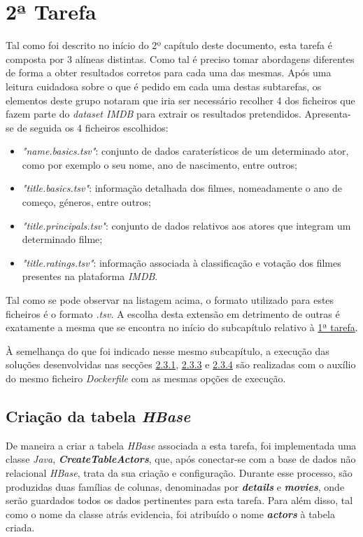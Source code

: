 \documentclass[a4paper]{report}
\begin{document}
{	\section{2ª Tarefa} \label{sec:Task2}
	Tal como foi descrito no início do 2º capítulo deste documento, esta tarefa é composta por 3 alíneas distintas. Como tal é preciso tomar abordagens diferentes de forma a obter resultados corretos para cada uma das mesmas. 
	Após uma leitura cuidadosa sobre o que é pedido em cada uma destas subtarefas, os elementos deste grupo notaram que iria ser necessário recolher 4 dos ficheiros que fazem parte do \textit{dataset IMDB} para extrair os resultados pretendidos.
	Apresenta-se de seguida os 4 ficheiros escolhidos:
	\begin{itemize}
		\item \textit{"name.basics.tsv"}: conjunto de dados caraterísticos de um determinado ator, como por exemplo o seu nome, ano de nascimento, entre outros;
		\item \textit{"title.basics.tsv"}: informação detalhada dos filmes, nomeadamente o ano de começo, géneros, entre outros;
		\item \textit{"title.principals.tsv"}: conjunto de dados relativos aos atores que integram um determinado filme;
		\item \textit{"title.ratings.tsv"}: informação associada à classificação e votação dos filmes presentes na plataforma \textit{IMDB}.
	\end{itemize}
	
	Tal como se pode observar na listagem acima, o formato utilizado para estes ficheiros é o formato \textit{.tsv}. A escolha desta extensão em detrimento de outras é exatamente a mesma que se encontra no início do subcapítulo relativo à \hyperref[sec:Task1]{1ª tarefa}.
	
	À semelhança do que foi indicado nesse mesmo subcapítulo, a execução das soluções desenvolvidas nas secções \hyperref[subsec:Task2-1]{2.3.1}, \hyperref[subsec:Task2-3]{2.3.3} e \hyperref[subsec:Task2-4]{2.3.4} são realizadas com o auxílio do mesmo ficheiro \textit{Dockerfile} com as mesmas opções de execução.
		
		\subsection{Criação da tabela \textit{HBase}} \label{subsec:Task2-1}
		De maneira a criar a tabela \textit{HBase} associada a esta tarefa, foi implementada uma classe \textit{Java}, \textbf{\textit{CreateTableActors}}, que, após conectar-se com a base de dados não relacional \textit{HBase}, trata da sua criação e configuração.
		Durante esse processo, são produzidas duas famílias de colunas, denominadas por \textbf{\textit{details}} e \textbf{\textit{movies}}, onde serão guardados todos os dados pertinentes para esta tarefa. Para além disso, tal como o nome da classe atrás evidencia, foi atribuído o nome \textbf{\textit{actors}} à tabela criada.

}
\end{document}
